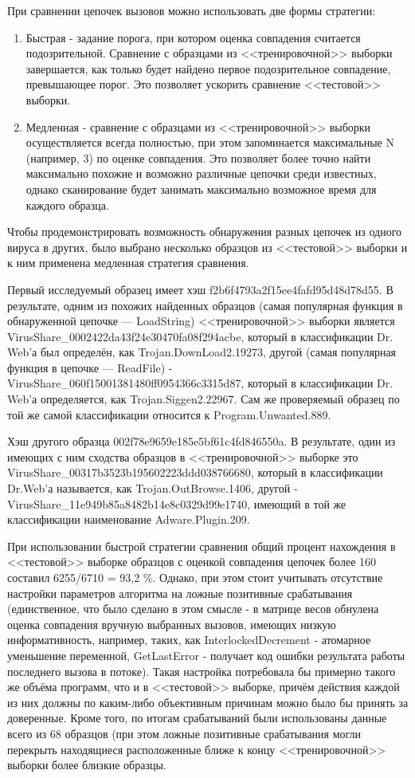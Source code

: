При сравнении цепочек вызовов можно использовать две формы стратегии:
\begin {enumerate}
	\item Быстрая - задание порога, при котором оценка совпадения считается подозрительной. Сравнение с образцами из <<тренировочной>> выборки завершается, как только будет найдено первое подозрительное совпадение, превышающее порог. Это позволяет ускорить сравнение <<тестовой>> выборки. 
	\item Медленная - сравнение с образцами из <<тренировочной>> выборки осуществляется всегда полностью, при этом запоминается максимальные N (например, 3) по оценке совпадения. Это позволяет более точно найти максимально похожие и возможно различные цепочки среди известных, однако сканирование будет занимать максимально возможное время для каждого образца.
\end {enumerate}

Чтобы продемонстрировать возможность обнаружения разных цепочек из одного вируса в других, было выбрано несколько образцов из <<тестовой>> выборки и к ним применена медленная стратегия сравнения.

Первый исследуемый образец имеет хэш f2b6f4793a2f15ee4fafd95d48d78d55. В результате, одним из похожих найденных образцов (самая популярная функция в обнаруженной цепочке --- LoadString) <<тренировочной>> выборки является VirusShare\_0002422da43f24e30470fa08f294acbe, который в классификации Dr. Web'а был определён, как Trojan.DownLoad2.19273, другой (самая популярная функция в цепочке --- ReadFile) - VirusShare\_060f15001381480ff0954366c3315d87, который в  классификации Dr. Web'а определяется, как Trojan.Siggen2.22967. Сам же проверяемый образец по той же самой классификации относится к Program.Unwanted.889.

Хэш другого образца 002f78e9659e185e5bf61c4fd846550a. В результате, один из имеющих с ним сходства образцов в <<тренировочной>> выборке это VirusShare\_00317b3523b195602223ddd038766680, который в классификации Dr.Web'а называется, как Trojan.OutBrowse.1406, другой - VirusShare\_11e949b85a8482b14e8c0329d99e1740, имеющий в той же классификации наименование Adware.Plugin.209.

При использовании быстрой стратегии сравнения общий процент нахождения в <<тестовой>> выборке образцов с оценкой совпадения цепочек более 160 составил 6255/6710 = 93,2 \%. Однако, при этом стоит учитывать отсутствие настройки параметров алгоритма на ложные позитивные срабатывания (единственное, что было сделано в этом смысле - в матрице весов обнулена оценка совпадения вручную выбранных вызовов, имеющих низкую информативность,  например, таких, как InterlockedDecrement - атомарное уменьшение переменной, GetLastError - получает код ошибки результата работы последнего вызова в потоке). Такая настройка потребовала бы примерно такого же объёма программ, что и в <<тестовой>> выборке, причём действия каждой из них должны по каким-либо объективным причинам можно было бы принять за доверенные. Кроме того, по итогам срабатываний были использованы данные всего из 68 образцов (при этом ложные позитивные срабатывания могли перекрыть находящиеся расположенные ближе к концу <<тренировочной>> выборки более близкие образцы.

